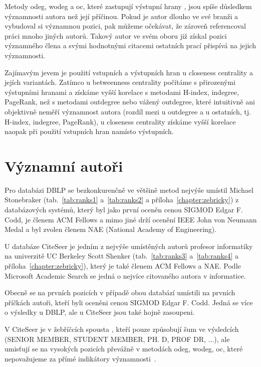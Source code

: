 \documentclass{bakalarka}
\begin{document}
Metody odeg, wodeg a oc, které zastupují výstupní hrany , jsou spíše
důsledkem významnosti autora než její příčinou. Pokud je autor dlouho ve své
branži a vybudoval si významnou pozici, pak můžeme očekávat, že zároveň
referencoval práci mnoho jiných autorů.  Takový autor ve svém oboru již získal
pozici významného člena a svými hodnotnými citacemi ostatních prací přispívá na
jejich významnosti.

Zajímavým jevem je použití vstupních a výstupních hran u closeness centrality a
jejích variantách. Zatímco u betweenness centrality počítáme s přirozenými
výstupními hranami a získáme vyšší korelace s metodami H-index, indegree,
PageRank, než s metodami outdegree nebo vážený outdegree, které intuitivně ani
objektivně neměří významnost autora (rozdíl mezi  u outdegree a
 u ostatních, tj. H-index, indegree, PageRank), u closeness
centrality získáme vyšší korelace naopak při použití vstupních hran namísto
výstupních.

\section{Významní autoři}
Pro databázi DBLP se bezkonkurenčně ve většině metod nejvýše umístil Michael
Stonebraker (tab.~\ref{tab:ranks1} a~\ref{tab:ranks2} a příloha~\ref{chapter:zebricky}) z databázových systémů, který byl jako první oceněn cenou SIGMOD
Edgar F. Codd, je členem ACM Fellows a mimo jiné drží ocenění IEEE John von
Neumann Medal a byl zvolen členem NAE (National Academy of Engineering).

U databáze CiteSeer je jedním z nejvýše umístěných autorů profesor informatiky
na univerzitě UC Berkeley Scott Shenker (tab.~\ref{tab:ranks3}
a~\ref{tab:ranks4} a příloha~\ref{chapter:zebricky}), který je také členem ACM
Fellows a NAE. Podle Microsoft Academic Search se jedná o nejvíce citovaného
autora v informatice.

Obecně se na prvních pozicích v případě obou databází umístili na prvních
příčkách autoři, kteří byli oceněni cenou SIGMOD Edgar F. Codd. Jedná se více o
výsledky u DBLP, ale u CiteSeer jsou také hojně zasoupeni.

V CiteSeer je v žebříčcích spousta , kteří pouze způsobují šum ve
výsledcích (SENIOR MEMBER, STUDENT MEMBER, PH. D, PROF DR, ...), ale umisťují
se na vysokých pozicích převážně v metodách odeg, wodeg, oc, které nepovažujeme
za přímé indikátory významnosti~\citep{mas}.
\end{document}
